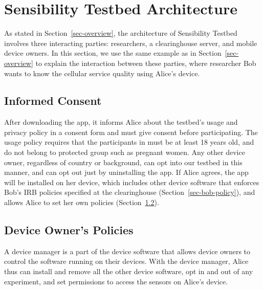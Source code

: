 \section{Sensibility Testbed Architecture}\label{sec-design}

As stated in Section~\ref{sec-overview}, the architecture of Sensibility 
Testbed involves three interacting parties:  
researchers, a clearinghouse server, and mobile device owners. In this section, we 
use the same example as in 
Section~\ref{sec-overview} to explain the interaction between these 
parties, where researcher Bob wants to know the cellular service quality 
using Alice's device.


\subsection{Informed Consent}\label{subsec:informed-consent}

After downloading the app, it informs Alice about the testbed's usage and 
privacy policy in a consent form and must give consent before participating.
The usage policy requires that the participants in \sysname must be at least 
18 years old, and do not belong to protected group such as pregnant women.
Any other device owner, regardless of country or background, can 
opt into our testbed in this manner, and can opt out just by uninstalling the app. 
If Alice agrees, the app will be installed on her device, which includes other
device software that enforces Bob's IRB policies specified at the 
clearinghouse (Section~\ref{sec-bob-policy}), and allows Alice to set her 
own policies (Section~\ref{sec-alice-policy}).


\subsection{Device Owner's Policies}\label{sec-alice-policy}
A device manager is a part of the device software that 
allows device owners to control the software running on their 
devices. With the device manager, Alice thus can install and remove 
all the other device software, opt in and out of any experiment, 
and set permissions to access the sensors on Alice's device. 

